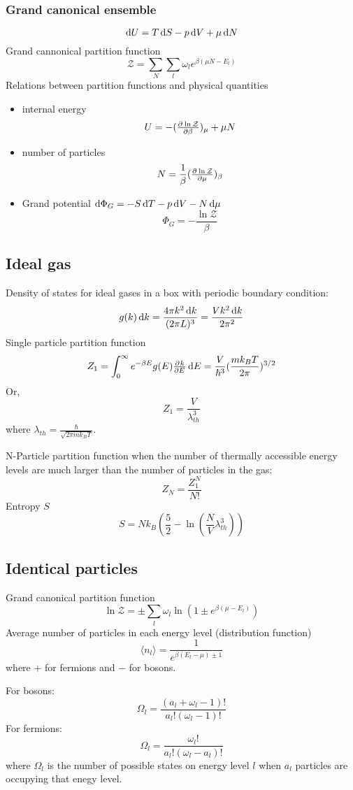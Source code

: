 \documentclass{article}
\begin{document}
\subsubsection{Grand canonical ensemble}
$$\dif U = T\dif S - p\dif V +\mu\dif N$$
Grand cannonical partition function
\begin{equation}
\label{eq:grandCanonicalPartitionFunction}
\mathcal{Z} = \sum_{N}\sum_{l}\omega_l e^{\beta(\mu N-E_l)}
\end{equation}
Relations between partition functions and physical quantities
\begin{itemize}
\item internal energy $$U=-(\pd{\ln \mathcal{Z}}{\beta})_{\mu}+\mu N$$
\item number of particles $$N=\frac{1}{\beta}(\pd{\ln\mathcal{Z}}{\mu})_{\beta}$$
\item Grand potential $\dif \Phi_G=-S\dif T -p\dif V-N\dif\mu$
 $$\Phi_G=-\frac{\ln \mathcal{Z}}{\beta}$$
\end{itemize}


\subsection{Ideal gas}
Density of states for ideal gases in a box with periodic boundary condition:
\begin{equation}
g(k)\dif k=\frac{4\pi k^2 \dif k}{(2\pi L)^3}=\frac{Vk^2 \dif k}{2\pi^2}
\end{equation}
Single particle partition function
\begin{equation}
Z_1=\int_0^{\infty}e^{-\beta E}g(E)\pd{k}{E}\dif E=\frac{V}{\hbar^3}(\frac{mk_BT}{2\pi})^{3/2}
\end{equation}
Or,
\begin{equation}
Z_1=\frac{V}{\lambda_{th}^3}
\end{equation}
where $\lambda_{th}=\frac{\hbar}{\sqrt{2\pi m k_B T}}$.\par
N-Particle partition function when the number of thermally accessible energy levels are much larger than 
the number of particles in the gas:
\begin{equation}
Z_N=\frac{Z_1^N}{N!}
\end{equation}
Entropy $S$
\begin{equation}
S = N k_B(\frac{5}{2}-\ln(\frac{N}{V}\lambda_{th}^3))
\end{equation}

\subsection{Identical particles}
Grand canonical partition function
$$\ln\mathcal{Z} = \pm\sum_{l}\omega_l\ln(1\pm e^{\beta(\mu-E_l)})$$
Average number of particles in each energy level (distribution function)
$$\langle n_l \rangle = \frac{1}{e^{\beta(E_l-\mu)\pm 1}}$$
where $+$ for fermions and $-$ for bosons.

For bosons:
$$\Omega_l = \frac{(a_l+\omega_l-1)!}{a_l!(\omega_l-1)!}$$
For fermions:
$$\Omega_l = \frac{\omega_l!}{a_l!(\omega_l-a_l)!}$$
where $\Omega_l$ is the number of possible states on energy level $l$ when $a_l$ particles are occupying 
that enegy level. 
\end{document}
